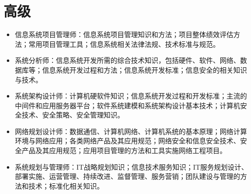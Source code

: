 \section{高级}
\begin{itemize}
\item 信息系统项目管理师：信息系统项目管理知识和方法；项目整体绩效评估方法；常用项目管理工具；信息系统相关法律法规、技术标准与规范。
\item 系统分析师：信息系统开发所需的综合技术知识，包括硬件、软件、网络、数据库等；信息系统开发过程和方法；信息系统开发标准；信息安全的相关知识与技术。
\item 系统架构设计师：计算机硬软件知识；信息系统开发过程和开发标准；主流的中间件和应用服务器平台；软件系统建模和系统架构设计基本技术；计算机安全技术、安全策略、安全管理知识。
\item 网络规划设计师：数据通信、计算机网络、计算机系统的基本原理；网络计算环境与网络应用；各类网络产品及其应用规范；网络安全和信息安全技术、安全产品及其应用规范；应用项目管理的方法和工具实施网络工程项目。
\item 系统规划与管理师：IT战略规划知识；信息技术服务知识；IT服务规划设计、部署实施、运营管理、持续改进、监督管理、服务营销；团队建设与管理的方法和技术；标准化相关知识。
\end{itemize}
